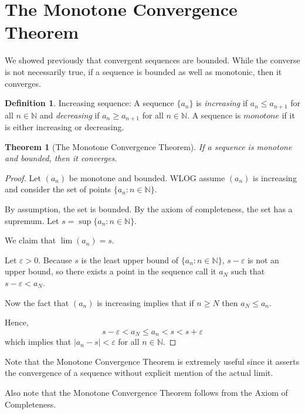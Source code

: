 \documentclass{tufte-book}
\newtheorem{theorem}{Theorem}[chapter]
\theoremstyle{definition}
\newtheorem{definition}{Definition}[chapter]
\numberwithin{section}{chapter}
\begin{document}
 


\smallskip

\section{The Monotone Convergence Theorem }
We showed previously that convergent sequences are bounded.  While the converse is not necessarily true, if a sequence is bounded as well as monotonic, then it converges.


\begin{definition}Increasing sequence:  A sequence $\{a_{n}\}$ is \emph{increasing} if $a_{n} \leq a_{n+1}$ for all $n \in \mathbb{N}$ and \emph{decreasing} if $a_{n} \geq a_{n+1}$ for all $n \in \mathbb{N}$.  A sequence is $monotone$ if it is either increasing or decreasing. \end{definition}

\begin{theorem}  [The Monotone Convergence Theorem] If a sequence is monotone and bounded, then it converges.
\end{theorem}

\begin{proof}
	Let $(a_n)$ be monotone and bounded.
	WLOG assume $(a_n)$  is increasing and consider the set of points $\{a_n : n \in \mathbb{N}\}$.
	
	By assumption, the set is bounded.  By the axiom of completeness, the set has a supremum.  Let $s = \sup\{a_n : n \in \mathbb{N}\}$.
	
	We claim that $\lim (a_n) = s$.
	
	Let $\varepsilon > 0$.  Because $s$ is the least upper bound of $\{a_n : n \in \mathbb{N}\}$, $s- \varepsilon$ is not an upper bound, so there exists  a point in the sequence call it $a_N$ such that $s-\varepsilon < a_N$.
	
	Now the fact that $(a_n)$ is increasing implies that if $n \geq N$ then $a_N \leq a_n$.
	
	Hence,
	$$ s- \varepsilon < a_N \leq a_n < s < s+\varepsilon $$
	which implies that $|a_n  - s| < \varepsilon$ for all $n \in \mathbb{N}$.
\end{proof}

Note that the Monotone Convergence Theorem is extremely useful since it asserts the convergence of a sequence without explicit mention of the actual limit.

Also note that the Monotone Convergence Theorem follows from the Axiom of Completeness.
\end{document}
